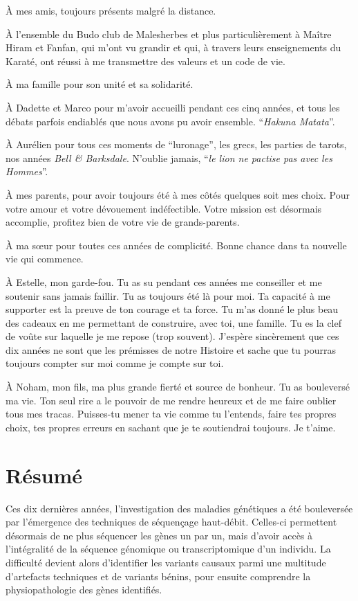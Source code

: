 \documentclass[12pt,a4paper,twoside]{ugathesis}
\theoremstyle{definition}
\theoremstyle{definition}
\theoremstyle{definition}
\theoremstyle{remark}
\begin{document}
À mes amis, toujours présents malgré la distance.

À l'ensemble du Budo club de Malesherbes et plus particulièrement à
Maître Hiram et Fanfan, qui m'ont vu grandir et qui, à travers leurs
enseignements du Karaté, ont réussi à me transmettre des valeurs et un
code de vie.

À ma famille pour son unité et sa solidarité.

À Dadette et Marco pour m'avoir accueilli pendant ces cinq années, et
tous les débats parfois endiablés que nous avons pu avoir ensemble.
``\emph{Hakuna Matata}''.

À Aurélien pour tous ces moments de ``luronage'', les grecs, les parties
de tarots, nos années \emph{Bell \& Barksdale}. N'oublie jamais,
``\emph{le lion ne pactise pas avec les Hommes}''.

À mes parents, pour avoir toujours été à mes côtés quelques soit mes
choix. Pour votre amour et votre dévouement indéfectible. Votre mission
est désormais accomplie, profitez bien de votre vie de grands-parents.

À ma sœur pour toutes ces années de complicité. Bonne chance dans ta
nouvelle vie qui commence.

À Estelle, mon garde-fou. Tu as su pendant ces années me conseiller et
me soutenir sans jamais faillir. Tu as toujours été là pour moi. Ta
capacité à me supporter est la preuve de ton courage et ta force. Tu
m'as donné le plus beau des cadeaux en me permettant de construire, avec
toi, une famille. Tu es la clef de voûte sur laquelle je me repose (trop
souvent). J'espère sincèrement que ces dix années ne sont que les
prémisses de notre Histoire et sache que tu pourras toujours compter sur
moi comme je compte sur toi.

À Noham, mon fils, ma plus grande fierté et source de bonheur. Tu as
bouleversé ma vie. Ton seul rire a le pouvoir de me rendre heureux et de
me faire oublier tous mes tracas. Puisses-tu mener ta vie comme tu
l'entends, faire tes propres choix, tes propres erreurs en sachant que
je te soutiendrai toujours. Je t'aime.

\chapter*{Résumé}\label{resume}

\newpage

Ces dix dernières années, l'investigation des maladies génétiques a été
bouleversée par l'émergence des techniques de séquençage haut-débit.
Celles-ci permettent désormais de ne plus séquencer les gènes un par un,
mais d'avoir accès à l'intégralité de la séquence génomique ou
transcriptomique d'un individu. La difficulté devient alors d'identifier
les variants causaux parmi une multitude d'artefacts techniques et de
variants bénins, pour ensuite comprendre la physiopathologie des gènes
identifiés.
\end{document}

